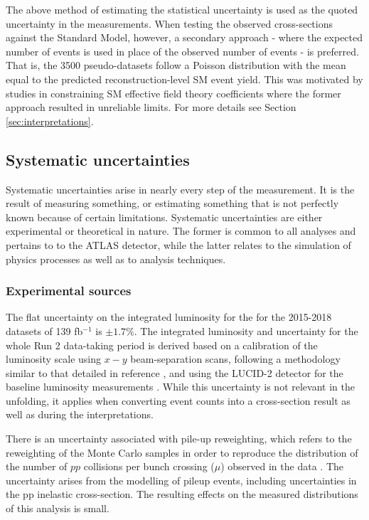 The above method of estimating the statistical uncertainty is used as the quoted uncertainty in the measurements. When testing the observed cross-sections against the Standard Model, however, a secondary approach - where the expected number of events is used in place of the observed number of events - is preferred. That is, the 3500 pseudo-datasets follow a Poisson distribution with the mean equal to the predicted reconstruction-level SM event yield. This was motivated by studies in constraining SM effective field theory coefficients where the former approach resulted in unreliable limits. For more details see Section \ref{sec:interpretations}.

\subsection{Systematic uncertainties} \label{ssec:systematics}
Systematic uncertainties arise in nearly every step of the measurement. It is the result of measuring something, or estimating something that is not perfectly known because of certain limitations\cite{barlow2002systematic}. Systematic uncertainties are either experimental or theoretical in nature. The former is common to all analyses and pertains to to the ATLAS detector, while the latter relates to the simulation of physics processes as well as to analysis techniques. 

\subsubsection{Experimental sources}
The flat uncertainty on the integrated luminosity for the for the 2015-2018 datasets of 139 fb$^{-1}$ is $\pm 1.7\%$. The integrated luminosity and uncertainty for the whole Run 2 data-taking period is derived based on a calibration of the luminosity scale using $x-y$ beam-separation scans, following a methodology similar to that detailed in reference \cite{ATLAS-2019-Luminosity}, and using the LUCID-2 detector for the baseline luminosity measurements \cite{Avoni-LUCID-2}. While this uncertainty is not relevant in the unfolding, it applies when converting event counts into a cross-section result as well as during the interpretations.

There is an uncertainty associated with pile-up reweighting, which refers to the reweighting of the Monte Carlo samples in order to reproduce the distribution of the number of $pp$ collisions per bunch crossing ($\mu$) observed in the data \cite{ATLAS_XS_pp}. The uncertainty arises from the modelling of pileup events, including uncertainties in the pp inelastic cross-section. The resulting effects on the measured distributions of this analysis is small.


